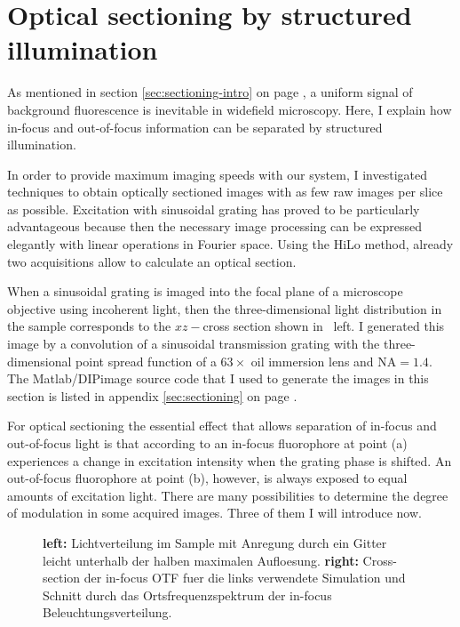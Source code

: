 \section{Optical sectioning by structured illumination}
\begin{summary}
  As mentioned in section \ref{sec:sectioning-intro} on page
  \pageref{sec:sectioning-intro}, a uniform signal of background
  fluorescence is inevitable in widefield microscopy. Here, I explain
  how in-focus and out-of-focus information can be separated by
  structured illumination.
\end{summary}
In order to provide maximum imaging speeds with our system, I
investigated techniques to obtain optically sectioned images with as
few raw images per slice as possible. Excitation with sinusoidal
grating has proved to be particularly advantageous because then the
necessary image processing can be expressed elegantly with linear
operations in Fourier space. Using the HiLo method, already two
acquisitions allow to calculate an optical section.

When a sinusoidal grating is imaged into the focal plane of a
microscope objective using incoherent light, then the
three-dimensional light distribution in the sample corresponds to the
$xz-$cross section shown in ~left.  I
generated this image by a convolution of a sinusoidal transmission
grating with the three-dimensional point spread function of a
$63\times$ oil immersion lens and $\textrm{NA}=1.4$.  The
Matlab/DIPimage source code that I used to generate the images in this
section is listed in appendix \ref{sec:sectioning} on page
\pageref{sec:sectioning}.

For optical sectioning the essential effect that allows separation of
in-focus and out-of-focus light is that according to
 an in-focus fluorophore at point (a)
experiences a change in excitation intensity when the grating phase is
shifted. An out-of-focus fluorophore at point (b), however, is always
exposed to equal amounts of excitation light. There are many
possibilities to determine the degree of modulation in some acquired
images. Three of them I will introduce now.

\begin{figure}[htbp]
  \centering
  \caption{{\bf left:} Lichtverteilung im Sample mit Anregung durch
    ein Gitter leicht unterhalb der halben maximalen Aufloesung. {\bf
      right:} Cross-section der in-focus OTF fuer die links verwendete
    Simulation und Schnitt durch das Ortsfrequenzspektrum der in-focus
    Beleuchtungsverteilung.}
  \label{fig:hilo-sec-Illum2}
\end{figure}

